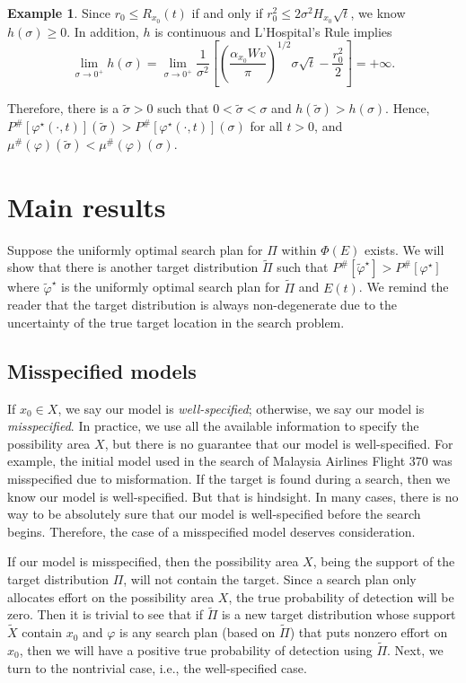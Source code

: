 \documentclass[12pt]{article}
\theoremstyle{plain}
\theoremstyle{definition}
\newtheorem{example}{Example}%
\theoremstyle{remark}
\begin{document}
\begin{example}
Since $r_0\leq R_{x_0}(t)$ if and only if $r^2_0\leq2\sigma^2 H_{x_0}\sqrt{t}$, we know $h(\sigma)\geq 0$. In addition,  $h$ is continuous and  L'Hospital's Rule implies
\[
\lim_{\sigma\rightarrow 0^+} h(\sigma)=\lim_{\sigma\rightarrow 0^+} \frac{1}{\sigma^2}\left[\left(\frac{\alpha_{x_0}Wv}{\pi}\right)^{1/2}\sigma\sqrt{t}-\frac{r_0^2}{2}\right]=+\infty.
\]

Therefore, there is a $\widetilde{\sigma}>0$ such that $0<\widetilde{\sigma}<\sigma$ and $h(\widetilde{\sigma})>h(\sigma)$.  Hence, $P^{\#}[\varphi^\star(\cdot, t)](\widetilde{\sigma})>P^{\#}[\varphi^\star(\cdot, t)](\sigma)$ for all $t>0$,  and $\mu^{\#}(\varphi)(\widetilde{\sigma})<\mu^{\#}(\varphi)(\sigma)$.


\end{example}


%
\section{Main results}

Suppose the uniformly optimal search plan for $\Pi$ within $\Phi(E)$ exists.  We will show that there is another target distribution $\widetilde{\Pi}$ such that $P^{\#}[\widetilde{\varphi}^\star]>P^{\#}[\varphi^\star]$ where $\widetilde{\varphi}^\star$ is the uniformly optimal search plan for $\widetilde{\Pi}$ and $E(t)$. We remind the reader that the target distribution is always non-degenerate due to the uncertainty of the true target location in the search problem. 




\subsection{Misspecified models}

If $x_0\in X$, we say our model is \emph{well-specified}; otherwise, we say our model is \emph{misspecified}.  In practice,  we use all the available information to specify the possibility area $X$, but there is no guarantee that our model is well-specified.  For example, the initial model used in the search of Malaysia Airlines Flight 370 was misspecified due to misformation.  If the target is found during a search, then we know our model is well-specified. But that is hindsight.  In many cases,  there is  no way to be absolutely sure that our model is well-specified before the search begins. Therefore,  the case of a misspecified model deserves consideration.

If our model is misspecified, then the possibility area $X$, being the support of the target distribution $\Pi$, will not contain the target.  Since a search plan only allocates effort on the possibility area $X$,  the true probability of detection will be zero.  Then it is trivial to see that if  $\widetilde{\Pi}$ is a new target distribution whose support $\widetilde{X}$ contain $x_0$ and $\varphi$ is any search plan (based on $\widetilde{\Pi}$) that puts nonzero effort on $x_0$, then we will have a positive true probability of detection using $\widetilde{\Pi}$.  Next, we turn to the nontrivial case, i.e., the well-specified case.
\end{document}
